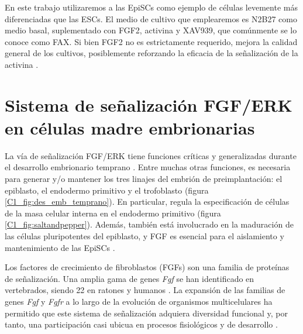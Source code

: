 \documentclass[./main.tex]{subfiles}
\begin{document}
En este trabajo utilizaremos a las EpiSCs como ejemplo de células levemente más diferenciadas que las ESCs. El medio de cultivo que emplearemos es N2B27 como medio basal, suplementado con FGF2, activina y XAV939, que comúnmente se lo conoce como FAX. Si bien FGF2 no es estrictamente requerido, mejora la calidad general de los cultivos, posiblemente reforzando la eficacia de la señalización de la activina \cite{Brons2007}.



\section{Sistema de señalización FGF/ERK en células madre embrionarias}
\label{C1_sec:FGF_ERK}


La vía de señalización FGF/ERK tiene funciones críticas y generalizadas durante el desarrollo embrionario temprano \cite{Kang2013,Nichols2009,Yamanaka2010,Krawchuk2013,Kang2017,Molotkov2017,Nichols2009,Morgani2013}. Entre muchas otras funciones, es necesaria para generar y/o mantener los tres linajes del embrión de preimplantación: el epiblasto, el endodermo primitivo y el trofoblasto (figura \ref{C1_fig:des_emb_temprano}). En particular, regula la especificación de células de la masa celular interna en el endodermo primitivo (figura \ref{C1_fig:saltandpepper}). Además, también está involucrado en la maduración de las células pluripotentes del epiblasto, y FGF es esencial para el aislamiento y mantenimiento de las EpiSCs \cite{Brons2007,Tesar2007}. 


Los factores de crecimiento de fibroblastos (FGFs) son una familia de proteínas de señalización. Una amplia gama de genes \textit{Fgf} se han identificado en vertebrados, siendo 22 en ratones y humanos \cite{Thisse2005}. La expansión de las familias de genes \textit{Fgf} y \textit{Fgfr} a lo largo de la evolución de organismos multicelulares ha permitido que este sistema de señalización adquiera diversidad funcional y, por tanto, una participación casi ubicua en procesos fisiológicos y de desarrollo \cite{Itoh2004,Powers2000,Goldfarb1996,Coumoul2003}. 
\end{document}
